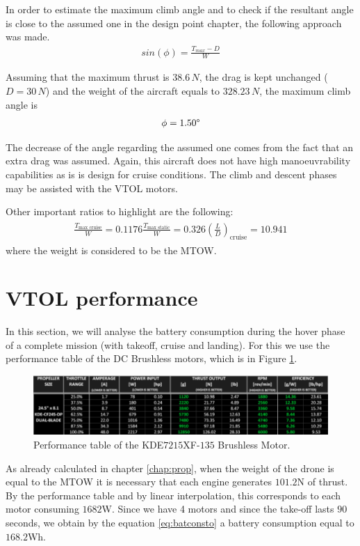 \documentclass[english,fira]{ist-report}
\begin{document}
In order to estimate the maximum climb angle and to check if the resultant angle is close to the assumed one in the design point chapter, the following approach was made. 
\begin{gather}
    sin(\phi)=\frac{T_{max}-D}{W}
\end{gather}

Assuming that the maximum thrust is $38.6\,N$, the drag is kept unchanged ($D=30\,N$) and the weight of the aircraft equals to $328.23\,N$, the maximum climb angle is
\begin{gather}
    \phi=1.50\degree
\end{gather}

The decrease of the angle regarding the assumed one comes from the fact that an extra drag was assumed. Again, this aircraft does not have high manoeuvrability capabilities as is is design for cruise conditions. The climb and descent phases may be assisted with the VTOL motors. 

Other important ratios to highlight are the following:
\begin{gather}
    \begin{gathered}
        \frac{T_{\text{max cruise}}}{W} = 0.1176
        \frac{T_{\text{max static}}}{W} = 0.326
        \left(\frac{L}{D}\right)_{\text{cruise}} = 10.941
    \end{gathered}
\end{gather}
where the weight is considered to be the MTOW.


\section{VTOL performance}
In this section, we will analyse the battery consumption during the hover phase of a complete mission (with takeoff, cruise and landing). For this we use the performance table of the DC Brushless motors, which is in Figure \ref{fig:vtolperf_table}.
\begin{figure}[ht]
    \centering
    \includegraphics[width = \linewidth]{graphics/vtolperf/table.png}
    \caption{Performance table of the KDE$7215$XF-$135$ Brushless Motor.}
    \label{fig:vtolperf_table}
\end{figure}
\par As already calculated in chapter \ref{chap:prop}, when the weight of the drone is equal to the MTOW it is necessary that each engine generates $101.2$N of thrust. By the performance table and by linear interpolation, this corresponds to each motor consuming $1682$W. Since we have 4 motors and since the take-off lasts $90$ seconds, we obtain by the equation \ref{eq:batconsto} a battery consumption equal to $168.2$Wh.
\end{document}
